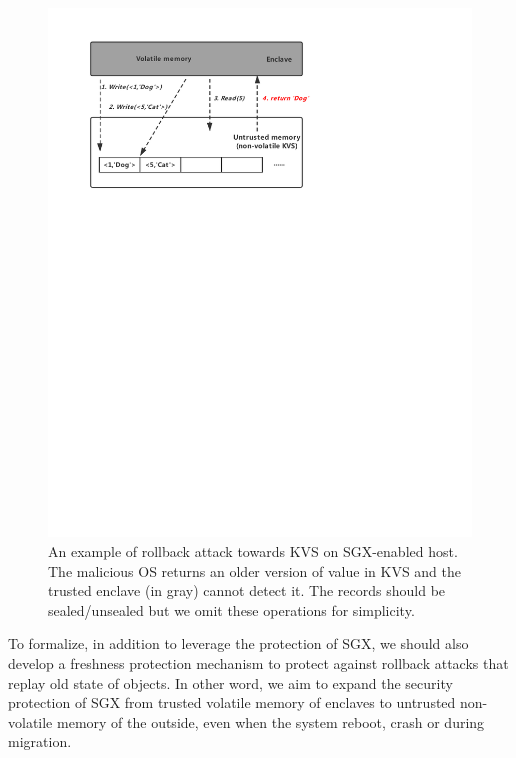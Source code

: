 \begin{figure}
    \centering
        \includegraphics[width=.45\textwidth]{rollback.pdf}
        \caption[title]{An example of rollback attack towards KVS on SGX-enabled host. 
        The malicious OS returns an older version of value in KVS and the trusted enclave (in gray)
        cannot detect it. The records should be sealed/unsealed but we omit these operations for simplicity.}
        \label{fig:rollback}
\end{figure}

To formalize, in addition to leverage the protection of SGX, we should also develop a freshness protection 
mechanism to protect against rollback attacks that replay old state of objects. In other word, we aim to expand 
the security protection of SGX from trusted volatile memory of enclaves to untrusted non-volatile memory of 
the outside, even when the system reboot, crash or during migration.
